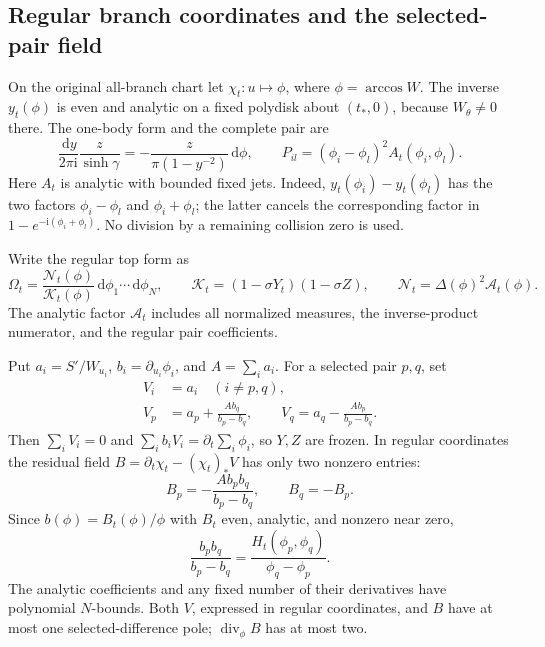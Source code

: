 \documentclass[11pt]{article}
\numberwithin{equation}{section}
\theoremstyle{definition}
\newcommand{\dd}{\,\mathrm d}
\newcommand{\ii}{\mathrm i}
\begin{document}
\subsection{Regular branch coordinates and the selected-pair field}
On the original all-branch chart let \(\chi_t:u\mapsto\phi\), where
\(\phi=\arccos W\). The inverse \(y_t(\phi)\) is even and analytic
on a fixed polydisk about \((t_*,0)\), because \(W_\theta\ne0\) there.
The one-body form and the complete pair are
\begin{equation}
 \frac{\dd y}{2\pi\ii}\frac{z}{\sinh\gamma}
   =-\frac{z}{\pi(1-y^{-2})}\dd\phi,\qquad
 P_{il}=(\phi_i-\phi_l)^2 A_t(\phi_i,\phi_l).
 \label{eq:branchregular}
\end{equation}
Here \(A_t\) is analytic with bounded fixed jets. Indeed,
\(y_t(\phi_i)-y_t(\phi_l)\) has the two factors
\(\phi_i-\phi_l\) and \(\phi_i+\phi_l\); the latter cancels the
corresponding factor in \(1-e^{-\ii(\phi_i+\phi_l)}\).
No division by a remaining collision zero is used.

Write the regular top form as
\[
 \Omega_t=
  \frac{\mathscr N_t(\phi)}{\mathcal K_t(\phi)}
       \dd\phi_1\cdots\dd\phi_N,\qquad
 \mathcal K_t=(1-\sigma Y_t)(1-\sigma Z),\qquad
 \mathscr N_t=\Delta(\phi)^2\mathscr A_t(\phi).
\]
The analytic factor \(\mathscr A_t\) includes all normalized measures,
the inverse-product numerator, and the regular pair coefficients.

Put \(a_i=S'/W_{u_i}\), \(b_i=\partial_{u_i}\phi_i\), and
\(A=\sum_i a_i\). For a selected pair \(p,q\), set
\begin{equation}
 \begin{split}
 V_i&=a_i\quad(i\ne p,q),\\
 V_p&=a_p+\frac{Ab_q}{b_p-b_q},\qquad
 V_q=a_q-\frac{Ab_p}{b_p-b_q}.
 \end{split}\label{eq:twofield}
\end{equation}
Then \(\sum_iV_i=0\) and
\(\sum_i b_iV_i=\partial_t\sum_i\phi_i\), so \(Y,Z\) are frozen.
In regular coordinates the residual field
\(B=\partial_t\chi_t-(\chi_t)_*V\) has only two nonzero entries:
\[
 B_p=-\frac{Ab_pb_q}{b_p-b_q},\qquad B_q=-B_p.
\]
Since \(b(\phi)=B_t(\phi)/\phi\) with \(B_t\) even, analytic, and
nonzero near zero,
\[
 \frac{b_pb_q}{b_p-b_q}
     =\frac{H_t(\phi_p,\phi_q)}{\phi_q-\phi_p}.
\]
The analytic coefficients and any fixed number of their derivatives
have polynomial \(N\)-bounds. Both \(V\), expressed in regular
coordinates, and \(B\) have at most one selected-difference pole;
\(\operatorname{div}_\phi B\) has at most two.
\end{document}
